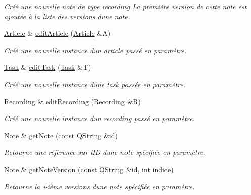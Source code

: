 \begin{DoxyCompactItemize}
\begin{DoxyCompactList}\small\item\em Créé une nouvelle note de type recording La première version de cette note est ajoutée à la liste des versions d\textquotesingle{}une note. \end{DoxyCompactList}\item 
\hyperlink{class_article}{Article} \& \hyperlink{class_notes_manager_a3259c7aa22b5f2eee6f7bceddc707b1d}{edit\+Article} (\hyperlink{class_article}{Article} \&A)
\begin{DoxyCompactList}\small\item\em Créé une nouvelle instance d\textquotesingle{}un article passé en paramètre. \end{DoxyCompactList}\item 
\hyperlink{class_task}{Task} \& \hyperlink{class_notes_manager_a8f8f2b6aaa8c7d41356f9e4be7da2da5}{edit\+Task} (\hyperlink{class_task}{Task} \&T)
\begin{DoxyCompactList}\small\item\em Créé une nouvelle instance d\textquotesingle{}une task passée en paramètre. \end{DoxyCompactList}\item 
\hyperlink{class_recording}{Recording} \& \hyperlink{class_notes_manager_a1c4cfa021a12b6416c4e800d643b5e0a}{edit\+Recording} (\hyperlink{class_recording}{Recording} \&R)
\begin{DoxyCompactList}\small\item\em Créé une nouvelle instance d\textquotesingle{}un recording passé en paramètre. \end{DoxyCompactList}\item 
\hyperlink{class_note}{Note} \& \hyperlink{class_notes_manager_a9c401bfe7c91ab37a7c8c4db398e92ff}{get\+Note} (const Q\+String \&id)
\begin{DoxyCompactList}\small\item\em Retourne une réfèrence sur l\textquotesingle{}ID d\textquotesingle{}une note spécifiée en paramètre. \end{DoxyCompactList}\item 
\hyperlink{class_note}{Note} \& \hyperlink{class_notes_manager_a0461145357fe17bf07c3b09c665b95db}{get\+Note\+Version} (const Q\+String \&id, int indice)
\begin{DoxyCompactList}\small\item\em Retourne la i-\/ième versions d\textquotesingle{}une note spécifiée en paramètre. \end{DoxyCompactList}\item 

\end{DoxyCompactItemize}

